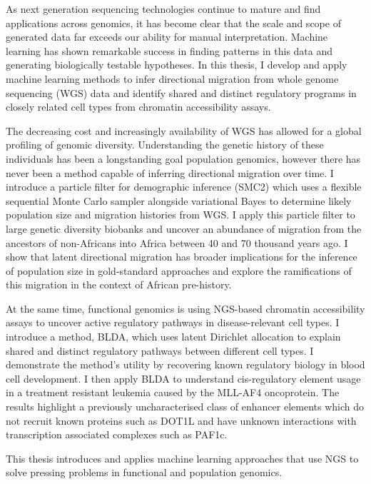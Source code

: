 As next generation sequencing technologies continue to mature and find applications across genomics, it has become clear that the scale and scope of generated data far exceeds our ability for manual interpretation. Machine learning has shown remarkable success in finding patterns in this data and generating biologically testable hypotheses. In this thesis, I develop and apply machine learning methods to infer directional migration from whole genome sequencing (WGS) data and identify shared and distinct regulatory programs in closely related cell types from chromatin accessibility assays. 

The decreasing cost and increasingly availability of WGS has allowed for a global profiling of genomic diversity. Understanding the genetic history of these individuals has been a longstanding goal population genomics, however there has never been a method capable of inferring directional migration over time. I introduce a particle filter for demographic inference (SMC2) which uses a flexible sequential Monte Carlo sampler alongside variational Bayes to determine likely population size and migration histories from WGS. I apply this particle filter to large genetic diversity biobanks and uncover an abundance of migration from the ancestors of non-Africans into Africa between 40 and 70 thousand years ago. I show that latent directional migration has broader implications for the inference of population size in gold-standard approaches and explore the ramifications of this migration in the context of African pre-history.

At the same time, functional genomics is using NGS-based chromatin accessibility assays to uncover active regulatory pathways in disease-relevant cell types. I introduce a method, BLDA, which uses latent Dirichlet allocation to explain shared and distinct regulatory pathways between different cell types. I demonstrate the method's utility by recovering known regulatory biology in blood cell development. I then apply BLDA to understand cis-regulatory element usage in a treatment resistant leukemia caused by the MLL-AF4 oncoprotein. The results highlight a previously uncharacterised class of enhancer elements which do not recruit known proteins such as DOT1L and have unknown interactions with transcription associated complexes such as PAF1c. 

This thesis introduces and applies machine learning approaches that use NGS to solve pressing problems in functional and population genomics. 
